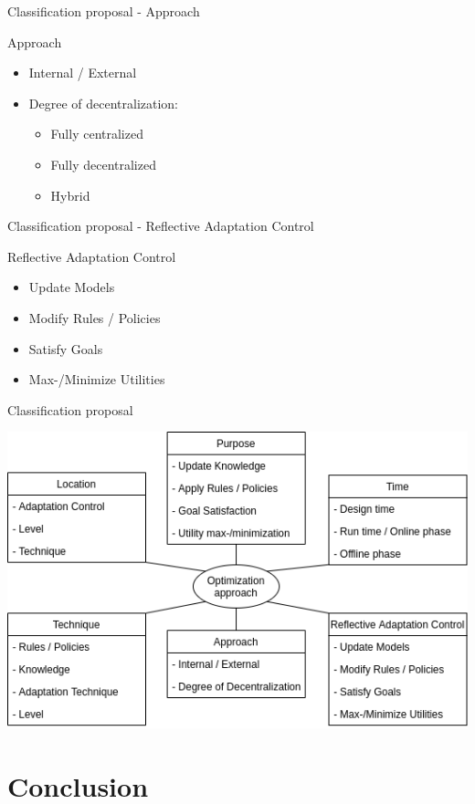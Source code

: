 \documentclass[en,16:9]{sdqbeamer}
\begin{document}
\begin{frame}{Classification proposal - Approach}
	\begin{greenblock}{Approach}
		\begin{itemize}
			\item Internal / External
			\item Degree of decentralization:
			\begin{itemize}
				\item Fully centralized
				\item Fully decentralized
				\item Hybrid
			\end{itemize}
		\end{itemize}
	\end{greenblock}
\end{frame}

\begin{frame}{Classification proposal - Reflective Adaptation Control}
	\begin{greenblock}{Reflective Adaptation Control}
		\begin{itemize}
			\item Update Models
			\item Modify Rules / Policies
			\item Satisfy Goals
			\item Max-/Minimize Utilities
		\end{itemize}
	\end{greenblock}
\end{frame}

\begin{frame}{Classification proposal}
	\begin{center}
		\includegraphics[width=.6\textwidth]{sources/ClassificationProposal-WithDimensions.png}
	\end{center}
\end{frame}

\section{Conclusion}
\end{document}
